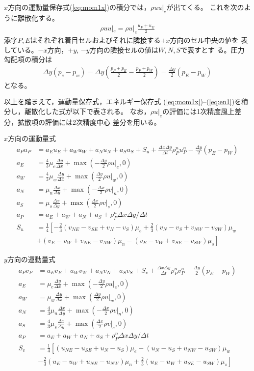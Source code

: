 \documentclass[a4paper,10pt,fleqn,dvipdfmx]{jsarticle}
\begin{document}
$x$方向の運動量保存式(\ref{eq:mom1x})の積分では，$\rho uu|_e$が出てくる。
これを次のように離散化する。
\begin{align}
 \rho uu|_e = \rho u|_e \frac{u_P +u_E}{2}
\end{align}
添字$P, E$はそれぞれ着目セルおよびそれに隣接する$+x$方向のセル中央の値を
表している。$-x$方向，$+y$, $-y$方向の隣接セルの値は$W, N, S$で表すとす
る。圧力勾配項の積分は
\begin{align}
 \Delta y(p_e - p_w) = \Delta y \left(\frac{p_P+p_E}{2} -
 \frac{p_P+p_W}{2}\right) = \frac{\Delta y}{2}(p_E-p_W)
\end{align}
となる。

以上を踏まえて，運動量保存式，エネルギー保存式
(\ref{eq:mom1x})--(\ref{eq:en1})を積分し，離散化した式が以下で表される。
なお，$\rho u|_e$の評価には1次精度風上差分，拡散項の評価には2次精度中心
差分を用いる。

$x$方向の運動量式
\begin{align}
  a_Pu_P&=a_E u_E + a_Wu_W + a_N u_N+a_S u_S +S_u +\frac{\Delta x\Delta
 y}{\Delta t}\rho_P^n u_P^n - \frac{\Delta y}{2}(p_E-p_W) \\
 a_E &= \frac{4}{3}\mu_e \frac{\Delta y}{\Delta x} + \max(-\frac{\Delta
 y}{2} \rho u|_e, 0)\\
a_W &=  \frac{4}{3}\mu_w \frac{\Delta y}{\Delta x} + \max(\frac{\Delta
 y}{2} \rho u|_w, 0)\\
 a_N &= \mu_n \frac{\Delta x}{\Delta y} + \max(-\frac{\Delta
 x}{2} \rho v|_n, 0)\\
 a_S &= \mu_s \frac{\Delta x}{\Delta y} + \max(\frac{\Delta
 x}{2} \rho v|_s, 0) \\
a_P &= a_E +a_W + a_N + a_S + \rho_P^n \Delta x \Delta y/\Delta t \\
S_u &= \frac{1}{4} \left[ -\frac{2}{3} (v_{NE}-v_{SE}+v_N-v_S) \mu_e
 + \frac{2}{3}(v_N-v_S+v_{NW}-v_{SW}) \mu_w\right. \nonumber \\
&\left. +(v_E-v_W +v_{NE} -v_{NW} )\mu_n - (v_E-v_W+v_{SE}-v_{SW})\mu_s \right]
\end{align}

$y$方向の運動量式
\begin{align}
  a_Pv_P&=a_E v_E + a_W v_W + a_N v_N+a_S v_S +S_v +\frac{\Delta x\Delta
 y}{\Delta t}\rho_P^n v_P^n - \frac{\Delta y}{2}(p_E-p_W) \\
 a_E &= \mu_e \frac{\Delta y}{\Delta x} + \max(-\frac{\Delta
 y}{2} \rho u|_e, 0)\\
a_W &=  \mu_w \frac{\Delta y}{\Delta x} + \max(\frac{\Delta
 y}{2} \rho u|_w, 0)\\
 a_N &= \frac{4}{3}\mu_n \frac{\Delta x}{\Delta y} + \max(-\frac{\Delta
 x}{2} \rho v|_n, 0)\\
 a_S &= \frac{4}{3}\mu_s \frac{\Delta x}{\Delta y} + \max(\frac{\Delta
 x}{2} \rho v|_s, 0) \\
a_P &= a_E +a_W + a_N + a_S + \rho_P^n \Delta x \Delta y/\Delta t \\
S_v &= \frac{1}{4} \left[ 
(u_{NE}-u_{SE}+u_N-u_S) \mu_e
 - (u_N-u_S+u_{NW}-u_{SW}) \mu_w\right. \nonumber \\
&\left. -\frac{2}{3}(u_E-u_W +u_{NE} -u_{NW} )\mu_n + \frac{2}{3}(u_E-u_W+u_{SE}-u_{SW})\mu_s \right]
\end{align}
\end{document}
